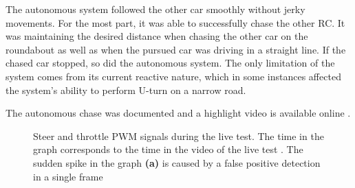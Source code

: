 \documentclass{ctuthesis/ctuthesis}
\begin{document}
The autonomous system followed the other car smoothly without jerky movements. For the most part, it was able to successfully chase the other RC. It was maintaining the desired distance when chasing the other car on the roundabout as well as when the pursued car was driving in a straight line. If the chased car stopped, so did the autonomous system. The only limitation of the system comes from its current reactive nature, which in some instances affected the system's ability to perform U-turn on a narrow road. \par

The autonomous chase was documented and a highlight video is available online \cite{my_yt_video}.

\begin{figure}[]
    \centering
    \quad
    \caption[Steer and throttle during autonomous RC car drive]{Steer and throttle PWM signals during the live test. The time in the graph corresponds to the time in the video of the live test \cite{my_yt_video}. The sudden spike in the graph \textbf{(a)} is caused by a false positive detection in a single frame}%
    \label{fig:prubeh}%
\end{figure}
\end{document}
